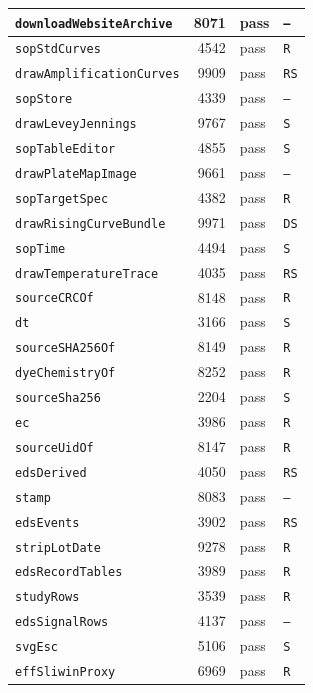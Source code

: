 {\begin{xltabular}{\linewidth}{|l|r|X|X|}
\texttt{downloadWebsiteArchive} & 8071 & pass & \texttt{--} \\ \hline
\texttt{sopStdCurves} & 4542 & pass & \texttt{R} \\ \hline
\texttt{drawAmplificationCurves} & 9909 & pass & \texttt{RS} \\ \hline
\texttt{sopStore} & 4339 & pass & \texttt{--} \\ \hline
\texttt{drawLeveyJennings} & 9767 & pass & \texttt{S} \\ \hline
\texttt{sopTableEditor} & 4855 & pass & \texttt{S} \\ \hline
\texttt{drawPlateMapImage} & 9661 & pass & \texttt{--} \\ \hline
\texttt{sopTargetSpec} & 4382 & pass & \texttt{R} \\ \hline
\texttt{drawRisingCurveBundle} & 9971 & pass & \texttt{DS} \\ \hline
\texttt{sopTime} & 4494 & pass & \texttt{S} \\ \hline
\texttt{drawTemperatureTrace} & 4035 & pass & \texttt{RS} \\ \hline
\texttt{sourceCRCOf} & 8148 & pass & \texttt{R} \\ \hline
\texttt{dt} & 3166 & pass & \texttt{S} \\ \hline
\texttt{sourceSHA256Of} & 8149 & pass & \texttt{R} \\ \hline
\texttt{dyeChemistryOf} & 8252 & pass & \texttt{R} \\ \hline
\texttt{sourceSha256} & 2204 & pass & \texttt{S} \\ \hline
\texttt{ec} & 3986 & pass & \texttt{R} \\ \hline
\texttt{sourceUidOf} & 8147 & pass & \texttt{R} \\ \hline
\texttt{edsDerived} & 4050 & pass & \texttt{RS} \\ \hline
\texttt{stamp} & 8083 & pass & \texttt{--} \\ \hline
\texttt{edsEvents} & 3902 & pass & \texttt{RS} \\ \hline
\texttt{stripLotDate} & 9278 & pass & \texttt{R} \\ \hline
\texttt{edsRecordTables} & 3989 & pass & \texttt{R} \\ \hline
\texttt{studyRows} & 3539 & pass & \texttt{R} \\ \hline
\texttt{edsSignalRows} & 4137 & pass & \texttt{--} \\ \hline
\texttt{svgEsc} & 5106 & pass & \texttt{S} \\ \hline
\texttt{effSliwinProxy} & 6969 & pass & \texttt{R} \\ \hline

\end{xltabular}}
